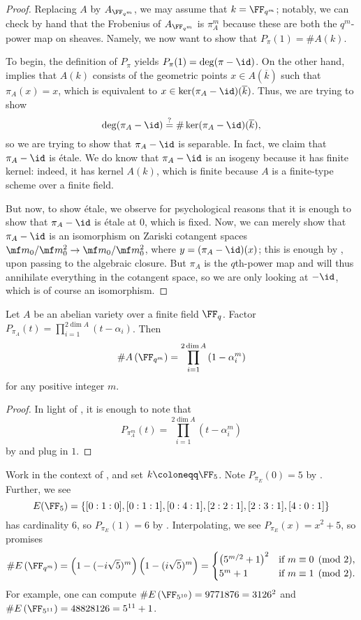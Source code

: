 \documentclass{amsart}
\begin{document}
\begin{proof}
	Replacing $A$ by $A_{\FF_{q^m}}$, we may assume that $k=\FF_{q^m}$; notably, we can check by hand that the Frobenius of $A_{\FF_{q^m}}$ is $\pi_A^m$ because these are both the $q^m$-power map on sheaves. Namely, we now want to show that $P_\pi(1)=\#A(k)$.
	
	To begin, the definition of $P_\pi$ yields $P_\pi(1)=\deg(\pi-{\id})$. On the other hand,  implies that $A(k)$ consists of the geometric points $x\in A(\overline k)$ such that $\pi_A(x)=x$, which is equivalent to $x\in\ker(\pi_A-{\id})(\overline k)$. Thus, we are trying to show
	\[\deg(\pi_A-{\id})\stackrel?=\#\ker(\pi_A-{\id})(\overline k),\]
	so we are trying to show that $\pi_A-{\id}$ is separable. In fact, we claim that $\pi_A-{\id}$ is \'etale. We do know that $\pi_A-\id$ is an isogeny because it has finite kernel: indeed, it has kernel $A(k)$, which is finite because $A$ is a finite-type scheme over a finite field.
	
	But now, to show \'etale, we observe for psychological reasons that it is enough to show that $\pi_A-\id$ is \'etale at $0$, which is fixed. Now, we can merely show that $\pi_A-\id$ is an isomorphism on Zariski cotangent spaces $\mf m_0/\mf m_0^2\to\mf m_0/\mf m_0^2$, where $y=(\pi_A-{\id})(x)$; this is enough by \cite[Proposition~III.10.4]{hartshorne}, upon passing to the algebraic closure. But $\pi_A$ is the $q$th-power map and will thus annihilate everything in the cotangent space, so we are only looking at $-\id$, which is of course an isomorphism.
\end{proof}
\begin{corollary} \label{cor:count-points-on-ab-var}
	Let $A$ be an abelian variety over a finite field $\FF_q$. Factor $P_{\pi_A}(t)=\prod_{i=1}^{2\dim A}(t-\alpha_i)$. Then
	\[\#A\left(\FF_{q^m}\right)=\prod_{i=1}^{2\dim A}\left(1-\alpha_i^m\right)\]
	for any positive integer $m$.
\end{corollary}
\begin{proof}
	In light of , it is enough to note that
	\[P_{\pi^m_A}(t)=\prod_{i=1}^{2\dim A}\left(t-\alpha_i^m\right)\]
	by  and plug in $1$.
\end{proof}
\begin{example}
	Work in the context of , and set $k\coloneqq\FF_5$. Note $P_{\pi_E}(0)=5$ by . Further, we see
	\[E(\FF_5)=\{[0 : 1 : 0], [0 : 1 : 1], [0 : 4 : 1], [2 : 2 : 1], [2 : 3 : 1], [4 : 0 : 1]\}\]
	has cardinality $6$, so $P_{\pi_E}(1)=6$ by . Interpolating, we see $P_{\pi_E}(x)=x^2+5$, so  promises
	\[\#E\left(\FF_{q^m}\right)=\left(1-(-i\sqrt5)^m\right)\left(1-(i\sqrt5)^m\right)=\begin{cases}
		\left(5^{m/2}+1\right)^2 & \text{if }m\equiv0\pmod2, \\
		5^m+1 & \text{if }m\equiv1\pmod2.
	\end{cases}\]
	For example, one can compute $\#E\left(\FF_{5^{10}}\right)=9771876=3126^2$ and $\#E\left(\FF_{5^{11}}\right)=48828126=5^{11}+1$.
\end{example}
\end{document}
